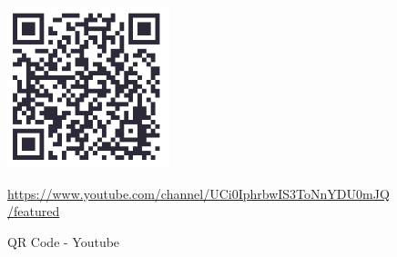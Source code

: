 \begin{figure}
    \centering
    \includegraphics{exemplos/QRCode/QR youtube.PNG}
    \caption{QR Code - Youtube}
    \underline{https://www.youtube.com/channel/UCi0IphrbwIS3ToNnYDU0mJQ/featured}
    \label{QRYoutube}
\end{figure}

    